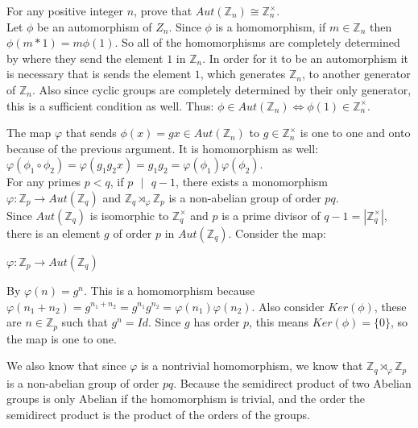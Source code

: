 \documentclass[12pt]{report}
\begin{document}
 For any positive integer $n$, prove that
$Aut(\mathbb{Z}_n) \cong \mathbb{Z}_n^{\times}$.\\

Let $\phi$ be an automorphism of $Z_{n}$. Since $\phi$ is a homomorphism, if $m
\in \mathbb{Z}_n$ then $\phi(m*1) = m\phi(1)$. So all of the homomorphisms are
completely determined by where they send the element $1$ in $\mathbb{Z}_n$.
In order for it to be an automorphism it is necessary that is sends the element
$1$, which generates $\mathbb{Z}_n$, to another generator of $\mathbb{Z}_n$.
Also since cyclic groups are completely determined by their only generator, this
is a sufficient condition as well. Thus: $\phi \in Aut(\mathbb{Z}_n) \iff
\phi(1) \in \mathbb{Z}_n^{\times}$.

The map $\varphi$ that sends $\phi(x) = gx \in Aut(\mathbb{Z}_n)$ to $g \in
\mathbb{Z}_n^{\times}$ is one to one and onto because of the previous argument.
It is homomorphism as well: $\varphi(\phi_1 \circ \phi_2) = \varphi(g_1g_2x) =
g_1g_2 = \varphi(\phi_1)\varphi(\phi_2)$.\\

 For any primes $p < q$, if $p \text{ }|\text{ }q-1$,
there exists a monomorphism $\varphi: \mathbb{Z}_p \to Aut(\mathbb{Z}_q)$ and
$\mathbb{Z}_q  \rtimes_{\varphi}\mathbb{Z}_p$ is a non-abelian group of order
$pq$.\\

Since $Aut(\mathbb{Z}_q)$ is isomorphic to $\mathbb{Z}_q^{\times}$ and $p$ is a
prime divisor of $q-1 = |\mathbb{Z}_q^{\times}|$, there is an element $g$ of
order $p$ in $Aut(\mathbb{Z}_q)$. Consider the map:

$\varphi: \mathbb{Z}_p \to Aut(\mathbb{Z}_q)$

By $\varphi(n) = g^n$. This is a homomorphism because $\varphi(n_1+n_2) =
g^{n_1+n_2} = g^{n_1}g^{n_2} = \varphi(n_1)\varphi(n_2)$. Also consider
$Ker(\phi)$, these are $n \in \mathbb{Z}_p$ such that $g^n = Id$. Since $g$ has
order $p$, this means $Ker(\phi) = \{ 0\}$, so the map is one to one.

We also know that since $\varphi$ is a nontrivial homomorphism, we know that
$\mathbb{Z}_q  \rtimes_{\varphi}\mathbb{Z}_p$ is a non-abelian group of order
$pq$. Because the semidirect product of two Abelian groups is only Abelian if
the homomorphism is trivial, and the order the semidirect product is the product
of the orders of the groups.\\
\end{document}

